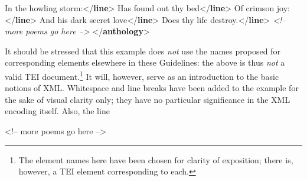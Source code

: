 \begin{shaded}
\hspace*{1em}\hspace*{1em}In the howling storm:{</\textbf{line}>}\mbox{}\newline 
\hspace*{1em}\mbox{}\newline 
\hspace*{1em}\mbox{}\newline 
\hspace*{1em}\hspace*{1em}Has found out thy bed{</\textbf{line}>}\mbox{}\newline 
\hspace*{1em}\hspace*{1em}Of crimson joy:{</\textbf{line}>}\mbox{}\newline 
\hspace*{1em}\hspace*{1em}And his dark secret love{</\textbf{line}>}\mbox{}\newline 
\hspace*{1em}\hspace*{1em}Does thy life destroy.{</\textbf{line}>}\mbox{}\newline 
\hspace*{1em}\mbox{}\newline 
{}\mbox{}\newline 
\textit{<!-- more poems go here -->}\mbox{}\newline 
{</\textbf{anthology}>}\end{shaded}\egroup\par \par
It should be stressed that this example does \textit{not} use the names proposed for corresponding elements elsewhere in these Guidelines: the above is thus \textit{not} a valid TEI document.\footnote{The element names here have been chosen for clarity of exposition; there is, however, a TEI element corresponding to each.} It will, however, serve as an introduction to the basic notions of XML. Whitespace and line breaks have been added to the example for the sake of visual clarity only; they have no particular significance in the XML encoding itself. Also, the line \par\hfill\bgroup\exampleFont\vskip 10pt\begin{shaded}
\obeyspaces <!-- more poems go here -->\end{shaded}
